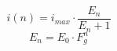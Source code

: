 \documentclass[pdflatex,sn-mathphys-num]{sn-jnl}%
\theoremstyle{thmstyleone}%
\theoremstyle{thmstyletwo}%
\theoremstyle{thmstylethree}%
\begin{document}
\begin{equation}
    i(n)= i_{max} \cdot \frac{E_n}{E_n+1}
	\label{eq:current_rotated_units}
\end{equation}
\begin{equation}
     E_n= E_0 \cdot F_g ^n
	\label{eq:efficacy_rotated}
\end{equation}

\end{document}
